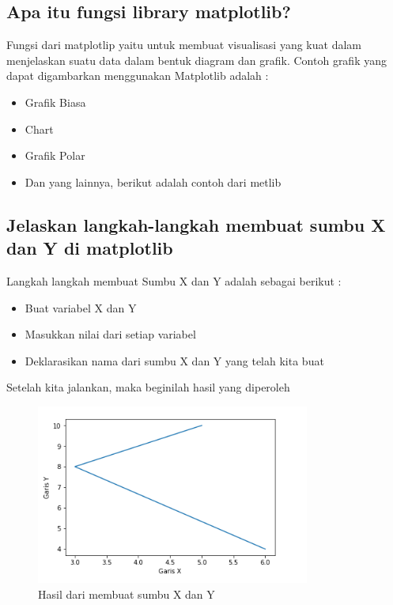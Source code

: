 \subsection{Apa itu fungsi library matplotlib?}
Fungsi dari matplotlip yaitu untuk membuat visualisasi yang kuat dalam menjelaskan suatu data dalam bentuk diagram dan grafik. 
Contoh grafik yang dapat digambarkan menggunakan Matplotlib adalah :
\begin{itemize}
    \item Grafik Biasa 
    \item Chart
    \item Grafik Polar
    \item Dan yang lainnya, berikut adalah contoh dari metlib

\end{itemize}

\subsection{Jelaskan langkah-langkah membuat sumbu X dan Y di matplotlib}
Langkah langkah membuat Sumbu X dan Y adalah sebagai berikut :
\begin{itemize}
    \item Buat variabel X dan Y
    \item Masukkan nilai dari setiap variabel
    
    \item Deklarasikan nama dari sumbu X dan Y yang telah kita buat
    
\end{itemize}

Setelah kita jalankan, maka beginilah hasil yang diperoleh
\begin{figure}[H]
    \includegraphics[width=9cm]{figures/6/Teori/1174051/1.png}
    \caption{Hasil dari membuat sumbu X dan Y}
    \centering
\end{figure}

